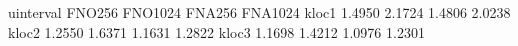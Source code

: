 uinterval   FNO256  FNO1024 FNA256  FNA1024
kloc1       1.4950	2.1724  1.4806	2.0238  
kloc2       1.2550	1.6371  1.1631	1.2822
kloc3       1.1698	1.4212  1.0976	1.2301